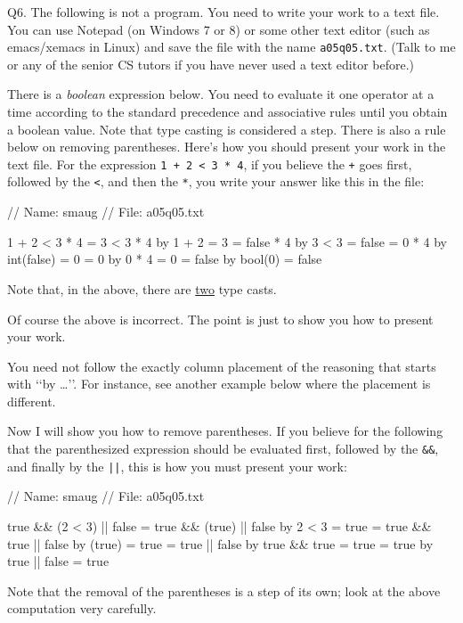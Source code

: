 Q6. The following is not a program. You need to write your work to a text file.
You can use Notepad (on Windows 7 or 8) or some other text editor
(such as emacs/xemacs in Linux) and save the file with the name
\verb!a05q05.txt!. (Talk to me or any of the senior CS tutors if you have never
used a text editor before.)

There is a \textit{boolean} expression below.
You need to evaluate it one operator at a
time according to the standard precedence and associative rules
until you obtain a boolean value.
Note that
type casting is considered a step. There is also a rule below on removing
parentheses. Here's how you should present your work in the text file. For the
expression \verb!1 + 2 < 3 * 4!, if you believe the \verb!+! goes first,
followed by the \verb!<!, and then the \verb!*!,  you write your answer like
this in the file:
\begin{console}
// Name: smaug
// File: a05q05.txt

1 + 2 < 3 * 4
= 3 < 3 * 4                                       by 1 + 2 = 3
= false * 4                                       by 3 < 3 = false
= 0 * 4                                           by int(false) = 0
= 0                                               by 0 * 4 = 0
= false                                           by bool(0) = false
\end{console}
Note that, in the above, there are \underline{two} type casts.

Of course the above is incorrect. The point is just to show you how to present
your work.

You need not follow the exactly column placement of the reasoning
that starts with \lq\lq by \dots\rq\rq. For instance, see another example
below where the placement is different.

Now I will show you how to remove parentheses. If you believe for the following
that the parenthesized expression should be evaluated first, followed by the
\verb!&&!, and finally by the \verb!||!, this is how you must present your
work:
\begin{console}
// Name: smaug
// File: a05q05.txt

true && (2 < 3) || false
= true && (true) || false                 by 2 < 3 = true
= true && true || false                   by (true) = true
= true || false                           by true && true = true
= true                                    by true || false = true
\end{console}
Note that the removal of the parentheses is a step of its own; look
at the above
computation very carefully.

